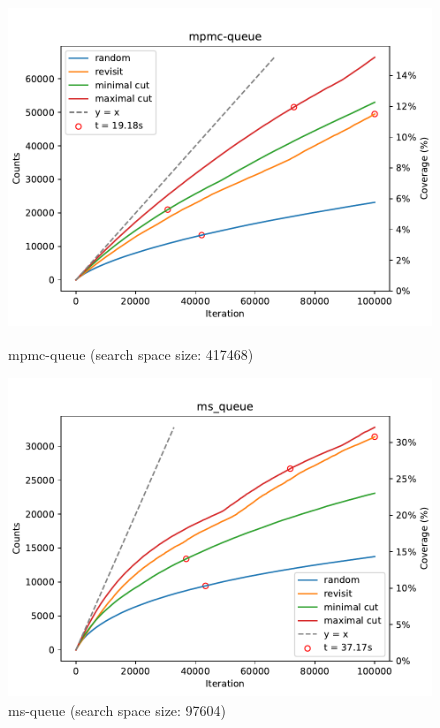 \begin{figure}[h!]
	\vspace{0.5cm}

	\begin{minipage}{0.45\textwidth}
		\centering
		\includegraphics[width=\textwidth]{figure/genmc/mpmc-queue.pdf}
		\caption{mpmc-queue (search space size: 417468)}
		\label{genmc:mpmc-queue}
	\end{minipage}
	\hfill
	\begin{minipage}{0.45\textwidth}
		\centering
		\includegraphics[width=\textwidth]{figure/genmc/ms_queue.pdf}
		\caption{ms-queue (search space size: 97604)}
		\label{genmc:ms-queue}
	\end{minipage}

	\vspace{0.5cm}


\end{figure}
